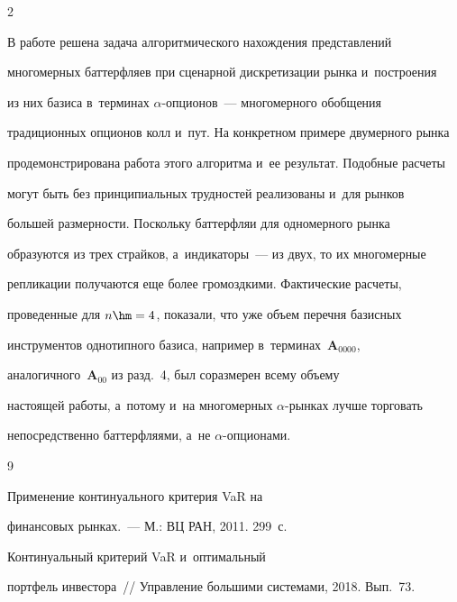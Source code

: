 \begin{multicols}{2}
  


  В работе решена задача алгоритмического на\-хож\-де\-ния пред\-став\-ле\-ний 


многомерных баттерфляев при сценарной дискретизации рынка и~\mbox{по\-стро\-ения} 


из них базиса в~терминах $\alpha$-оп\-ци\-онов~--- многомерного обобщения 


традиционных опционов колл и~пут. На конкретном примере двумерного рынка 


продемонстрирована работа этого алгоритма и~ее результат. Подобные расчеты 


могут быть без принципиальных трудностей реализованы и~для рынков 


большей размерности. Поскольку бат\-тер\-фляи для одномерного рынка 


образуются из трех страй\-ков, а~индикаторы~--- из двух, то их многомерные 


реп\-ли\-ка\-ции получаются еще более громоздкими. Фактические расчеты, 


проведенные для $n\hm=4$, показали, что уже объем перечня базисных 


инструментов однотипного базиса, например в~терминах~$\bm{A}_{0000}$, 


аналогичного~$\bm{A}_{00}$ из разд.~4, был соразмерен всему объему 


на\-сто\-ящей работы, а~потому и~на многомерных $\alpha$-рын\-ках лучше торговать 


непосредственно бат\-тер\-фля\-ями, а~не $\alpha$-оп\-ци\-онами. 


  


{\small\frenchspacing


 {%




 \begin{thebibliography}{9}




   Применение континуального критерия VaR на 


финансовых рынках.~--- М.: ВЦ РАН, 2011. 299~с. 




   Континуальный критерий VaR и~оптимальный 


портфель инвестора~// Управ\-ле\-ние большими сис\-те\-ма\-ми, 2018. Вып.~73. 



\end{thebibliography}}}
\end{multicols}
